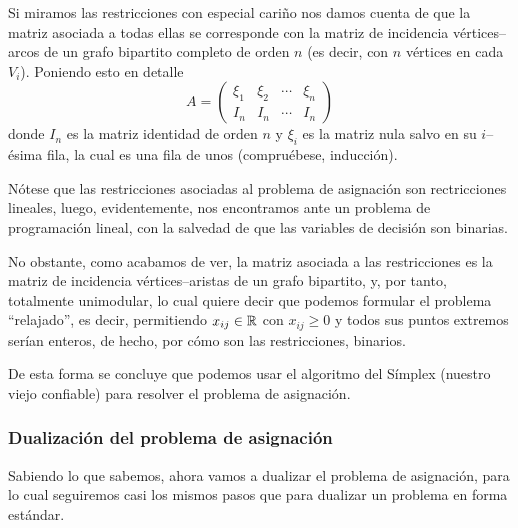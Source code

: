 Si miramos las restricciones con especial cariño nos damos cuenta de que la matriz asociada a todas ellas se corresponde con la matriz de incidencia vértices--arcos de un grafo bipartito completo de orden $n$ (es decir, con $n$ vértices en cada $V_i$). Poniendo esto en detalle
\begin{equation*}
	A=\left(\begin{array}{c|c|c|c}
		\xi_1 & \xi_2 & \cdots & \xi_n\\
		\hline
		I_n& I_n & \cdots & I_n
	\end{array}\right)
\end{equation*}
donde $I_n$ es la matriz identidad de orden $n$ y $\xi_i$ es la matriz nula salvo en su $i$--ésima fila, la cual es una fila de unos (compruébese, inducción).
\begin{obs}
	Nótese que las restricciones asociadas al problema de asignación son rectricciones lineales, luego, evidentemente, nos encontramos ante un problema de programación lineal, con la salvedad de que las variables de decisión son binarias.
	
	No obstante, como acabamos de ver, la matriz asociada a las restricciones es la matriz de incidencia vértices--aristas de un grafo bipartito, y, por tanto, totalmente unimodular, lo cual quiere decir que podemos formular el problema ``relajado'', es decir, permitiendo $x_{ij}\in\mathbb{R}$ con $x_{ij}\geq 0$ y todos sus puntos extremos serían enteros, de hecho, por cómo son las restricciones, binarios.
	
	De esta forma se concluye que podemos usar el algoritmo del Símplex (nuestro viejo confiable) para resolver el problema de asignación.
\end{obs}
\subsubsection{Dualización del problema de asignación}
Sabiendo lo que sabemos, ahora vamos a dualizar el problema de asignación, para lo cual seguiremos casi los mismos pasos que para dualizar un problema en forma estándar.


